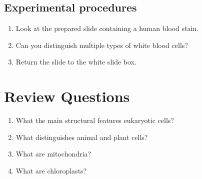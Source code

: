 \subsection{Experimental procedures}\label{experimental-procedures-12}

\begin{enumerate}
\def\labelenumi{\arabic{enumi}.}
\tightlist
\item
  Look at the prepared slide containing a human blood stain.
\item
  Can you distinguish multiple types of white blood cells?
\item
  Return the slide to the white slide box.
\end{enumerate}

\section{Review Questions}\label{review-questions-2}

\begin{enumerate}
\def\labelenumi{\arabic{enumi}.}
\tightlist
\item
  What the main structural features eukaryotic cells?
\item
  What distinguishes animal and plant cells?
\item
  What are mitochondria?
\item
  What are chloroplasts?
\end{enumerate}
